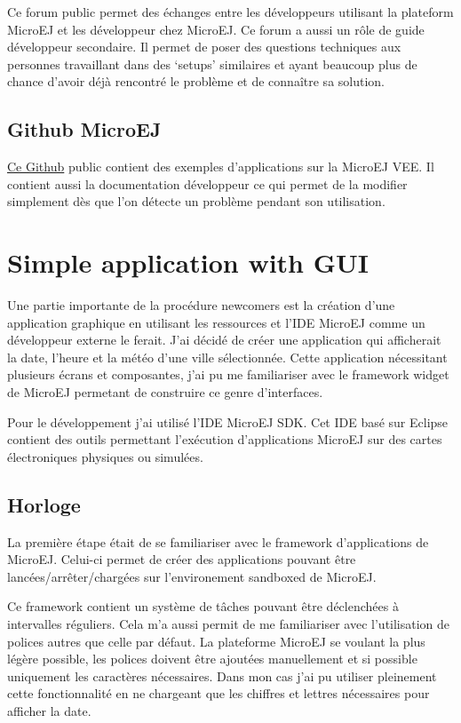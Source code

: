 \documentclass[french,a4paper,12pt]{report}
\begin{document}
Ce forum public permet des échanges entre les développeurs utilisant la plateform MicroEJ et les développeur chez MicroEJ. Ce forum a aussi un rôle de guide développeur secondaire. Il permet de poser des questions techniques aux personnes travaillant dans des ‘setups’ similaires et ayant beaucoup plus de chance d’avoir déjà rencontré le problème et de connaître sa solution.

\subsection{Github MicroEJ}

\href{https://github.com/MicroEJ}{Ce Github} public contient des exemples d’applications sur la MicroEJ VEE. Il contient aussi la documentation développeur ce qui permet de la modifier simplement dès que l'on détecte un problème pendant son utilisation.

\section{Simple application with GUI}

Une partie importante de la procédure newcomers est la création d'une application graphique en utilisant les ressources et l'IDE MicroEJ comme un développeur externe le ferait. 
J'ai décidé de créer une application qui afficherait la date, l'heure et la météo d'une ville sélectionnée. Cette application nécessitant plusieurs écrans et composantes, j'ai pu me familiariser avec le framework widget de MicroEJ permetant de construire ce genre d'interfaces.

Pour le développement j'ai utilisé l'IDE MicroEJ SDK. Cet IDE basé sur Eclipse contient des outils permettant l’exécution d'applications MicroEJ sur des cartes électroniques physiques ou simulées.

\subsection{Horloge}

La première étape était de se familiariser avec le framework d’applications de MicroEJ. Celui-ci permet de créer des applications pouvant être lancées/arrêter/chargées sur l’environement sandboxed de MicroEJ. 

Ce framework contient un système de tâches pouvant être déclenchées à intervalles réguliers.
Cela m’a aussi permit de me familiariser avec l’utilisation de polices autres que celle par défaut. La plateforme MicroEJ se voulant la plus légère possible, les polices doivent être ajoutées manuellement et si possible uniquement les caractères nécessaires. Dans mon cas j’ai pu utiliser pleinement cette fonctionnalité en ne chargeant que les chiffres et lettres nécessaires pour afficher la date. 
\end{document}
